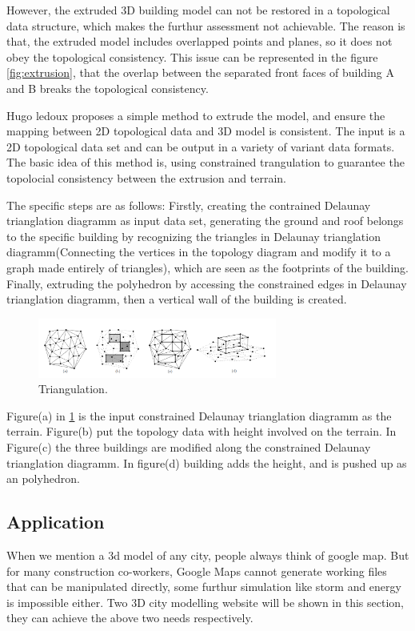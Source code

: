 However, the extruded 3D building model can not be restored in a topological data structure, which makes the furthur assessment not achievable. The reason is that, the extruded model includes overlapped points and planes, so it does not obey the topological consistency. This issue can be represented in the figure \ref{fig:extrusion}, that the overlap between the separated front faces of building A and B breaks the topological consistency.

Hugo ledoux proposes a simple method\cite{ledoux2011topologically} to extrude the model, and ensure the mapping between 2D topological data and 3D model is consistent.  The input is a 2D topological data set and can be output in a variety of variant data formats. The basic idea of this method is, using constrained trangulation to guarantee the topolocial consistency between the extrusion and terrain.

The specific steps are as follows: Firstly, creating the contrained Delaunay trianglation diagramm as input data set, generating the ground and roof belongs to the specific building by recognizing the triangles in Delaunay trianglation diagramm(Connecting the vertices in the topology diagram and modify it to a graph made entirely of triangles), which are seen as the footprints of the building. Finally, extruding the polyhedron by accessing the constrained edges in Delaunay trianglation diagramm, then a vertical wall of the building is created.

\begin{figure}[htb]
	\centering
	\includegraphics[width=0.7\textwidth]{gfx/triangulation}  	  	 	
	\caption{Triangulation.\cite{ledoux2011topologically}}
	\label{fig:triangulation}
\end{figure}

Figure(a) in \ref{fig:triangulation} is the input constrained Delaunay trianglation diagramm as the terrain. Figure(b) put the topology data with height involved on the terrain. In Figure(c) the three buildings are modified along the constrained Delaunay trianglation diagramm. In figure(d) building adds the height, and is pushed up as an polyhedron.

\subsection{Application}
When we mention a 3d model of any city, people always think of google map. But for many construction co-workers, Google Maps cannot generate working files that can be manipulated directly, some furthur simulation like storm and energy is impossible either. Two 3D city modelling website will be shown in this section, they can achieve the above two needs respectively.

